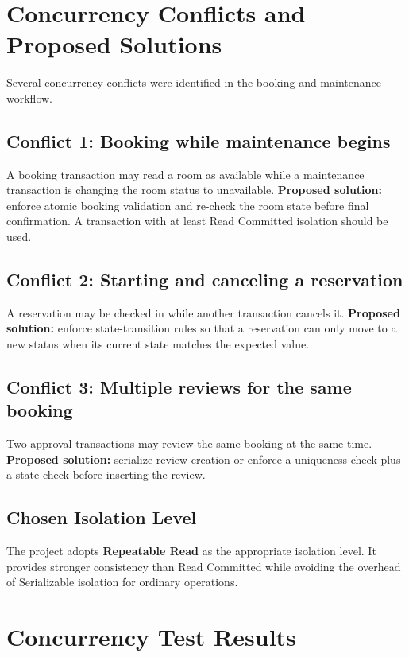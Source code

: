 \documentclass[12pt,a4paper]{article}
\begin{document}
\section{Concurrency Conflicts and Proposed Solutions}

Several concurrency conflicts were identified in the booking and maintenance workflow.

\subsection{Conflict 1: Booking while maintenance begins}
A booking transaction may read a room as available while a maintenance transaction is changing the room status to unavailable.\newline
\textbf{Proposed solution:} enforce atomic booking validation and re-check the room state before final confirmation. A transaction with at least Read Committed isolation should be used.

\subsection{Conflict 2: Starting and canceling a reservation}
A reservation may be checked in while another transaction cancels it.\newline
\textbf{Proposed solution:} enforce state-transition rules so that a reservation can only move to a new status when its current state matches the expected value.

\subsection{Conflict 3: Multiple reviews for the same booking}
Two approval transactions may review the same booking at the same time.\newline
\textbf{Proposed solution:} serialize review creation or enforce a uniqueness check plus a state check before inserting the review.

\subsection{Chosen Isolation Level}
The project adopts \textbf{Repeatable Read} as the appropriate isolation level. It provides stronger consistency than Read Committed while avoiding the overhead of Serializable isolation for ordinary operations.

\section{Concurrency Test Results}
\end{document}
